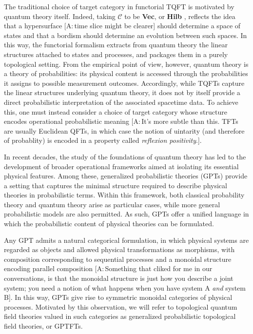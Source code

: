 \documentclass[prl,aps,10pt,superscriptaddress, floatfix]{revtex4-2}
\newcommand\al[1]{\textcolor{pansypurple}{ [A:\,#1]}}
\begin{document}
The traditional choice of target category in functorial TQFT is motivated by quantum theory itself.  Indeed, taking $\mathcal {C}$ to be \textbf{Vec}, or \textbf{Hilb} , reflects the idea that a hypersurface \al{time slice might be clearer} should determine a space of states and that a bordism should determine an evolution between such spaces. In this way, the functorial formalism extracts from quantum theory the linear structures attached to states and processes, and packages them in a purely topological setting. From the empirical point of view, however, quantum theory is a theory of probabilities: its physical content is accessed through the probabilities it assigns to possible measurement outcomes. Accordingly, while TQFTs capture the linear structures underlying quantum theory, it does not by itself provide a direct probabilistic interpretation of the associated spacetime data.  To achieve this, one must instead consider a choice of target category whose structure encodes operational probabilistic meaning \al{It's more subtle than this. TFTs are usually Euclidean QFTs, in which case the notion of uintarity (and therefore of probablity) is encoded in a property called \textit{reflexion positivity}.}.

In recent decades, the study of the foundations of quantum theory has led to the development of broader operational frameworks aimed at isolating its essential physical features. Among these, generalized probabilistic theories (GPTs) provide a setting that captures the minimal structure required to describe physical theories in probabilistic terms. Within this framework, both classical probability theory and quantum theory arise as particular cases, while more general  probabilistic models are also permitted. As such, GPTs offer a unified language in which the probabilistic content of physical theories can be formulated.

Any GPT admits a natural categorical formulation, in which physical systems are regarded as objects and allowed physical transformations as morphisms, with composition corresponding to sequential processes and a monoidal structure encoding parallel composition \al{Something that cliked for me in our conversations, is that the monoidal structure is just how you describe a joint system; you need a notion of what happens when you have system A \textit{and} system B}. In this way, GPTs give rise to symmetric monoidal categories of physical processes. Motivated by this observation, we will refer to topological quantum field theories valued in such categories as generalized probabilistic topological field theories, or GPTFTs.
\end{document}
